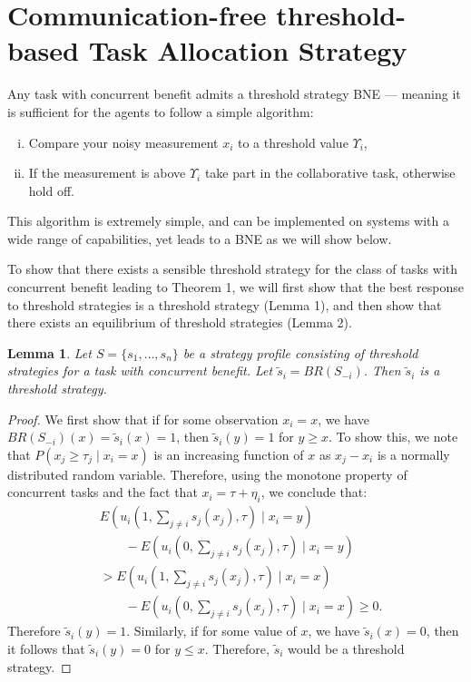 \documentclass[defaultstyle,12pt]{thesis}
\newtheorem{lemma}{Lemma}
\newcommand{\td}{\Upsilon}   %
\begin{document}
\section{Communication-free threshold-based Task Allocation Strategy}\label{sec:discretethreshold}
Any task with concurrent benefit admits a threshold strategy BNE --- meaning it is sufficient for the agents to follow a simple algorithm: 
\begin{enumerate}[(i)]
\item Compare your noisy measurement $x_i$ to a threshold value $\td_i$,
\item If the measurement is above $\td_i$ take part in the collaborative task, otherwise hold off.
\end{enumerate}
This algorithm is extremely simple, and can be implemented on systems with a wide range of capabilities, yet leads to a BNE as we will show below.

To show that there exists a sensible threshold strategy for the class of tasks with concurrent benefit leading to Theorem 1, we will first show that the best response to threshold strategies is a threshold strategy (Lemma 1), and then show that there exists an equilibrium of threshold strategies \cite{Carlsson1993,Morris2000} (Lemma 2).

\setcounter{lemma}{0}

\begin{lemma}
Let $S=\{s_1,\ldots,s_n\}$ be a strategy profile consisting of threshold strategies for a task with  concurrent benefit. Let $\tilde{s}_i=BR(S_{-i})$. Then $\tilde{s}_i$ is a threshold strategy. 
\end{lemma} 

\begin{proof}
We first show that if for some observation $x_i=x$, we have $BR(S_{-i})(x)=\tilde{s}_i(x)=1$, then $\tilde{s}_i(y)=1$ for $y\geq x$. To show this,  we note that $P(x_j\geq \tau_j\mid x_i=x)$ is an increasing function of $x$ as $x_j-x_i$ is a normally distributed random variable. Therefore, using the monotone property of concurrent tasks and the fact that $x_i=\tau+\eta_i$, we conclude that:
\vspace{-5px}
\begin{align}
&E(u_i(1,\sum_{j\not=i}s_j(x_j),\tau)\mid x_i=y)\\ 
&\qquad-E(u_i(0,\sum_{j\not=i}s_j(x_j),\tau)\mid x_i=y)\\ 
&>E(u_i(1,\sum_{j\not=i}s_j(x_j),\tau)\mid x_i=x)\\
&\qquad-E(u_i(0,\sum_{j\not=i}s_j(x_j),\tau)\mid x_i=x)\geq 0.
\end{align}
Therefore $\tilde{s}_i(y)=1$. Similarly, if for some value of $x$, we have $\tilde{s}_i(x)=0$, then it follows that $\tilde{s}_i(y)=0$ for $y\leq x$. Therefore, $\tilde{s}_i$ would be a threshold strategy.  
\end{proof}
\end{document}
